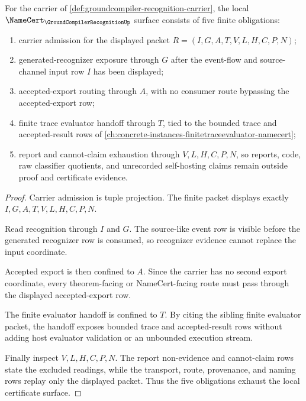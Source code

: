 \begin{theorem}
\label{thm:groundcompiler-recognition-namecert-obligations}
For the carrier of \autoref{def:groundcompiler-recognition-carrier}, the local $\NameCert_{\GroundCompilerRecognitionUp}$ surface consists of five finite obligations:
\begin{enumerate}
\item carrier admission for the displayed packet $R=(I,G,A,T,V,L,H,C,P,N)$;
\item generated-recognizer exposure through $G$ after the event-flow and source-channel input row $I$ has been displayed;
\item accepted-export routing through $A$, with no consumer route bypassing the accepted-export row;
\item finite trace evaluator handoff through $T$, tied to the bounded trace and accepted-result rows of \autoref{ch:concrete-instances-finitetraceevaluator-namecert};
\item report and cannot-claim exhaustion through $V,L,H,C,P,N$, so reports, code, raw classifier quotients, and unrecorded self-hosting claims remain outside proof and certificate evidence.
\end{enumerate}
\end{theorem}
\begin{proof}
Carrier admission is tuple projection. The finite packet displays exactly $I,G,A,T,V,L,H,C,P,N$.

Read recognition through $I$ and $G$. The source-like event row is visible before the generated recognizer row is consumed, so recognizer evidence cannot replace the input coordinate.

Accepted export is then confined to $A$. Since the carrier has no second export coordinate, every theorem-facing or NameCert-facing route must pass through the displayed accepted-export row.

The finite evaluator handoff is confined to $T$. By citing the sibling finite evaluator packet, the handoff exposes bounded trace and accepted-result rows without adding host evaluator validation or an unbounded execution stream.

Finally inspect $V,L,H,C,P,N$. The report non-evidence and cannot-claim rows state the excluded readings, while the transport, route, provenance, and naming rows replay only the displayed packet. Thus the five obligations exhaust the local certificate surface.
\end{proof}

